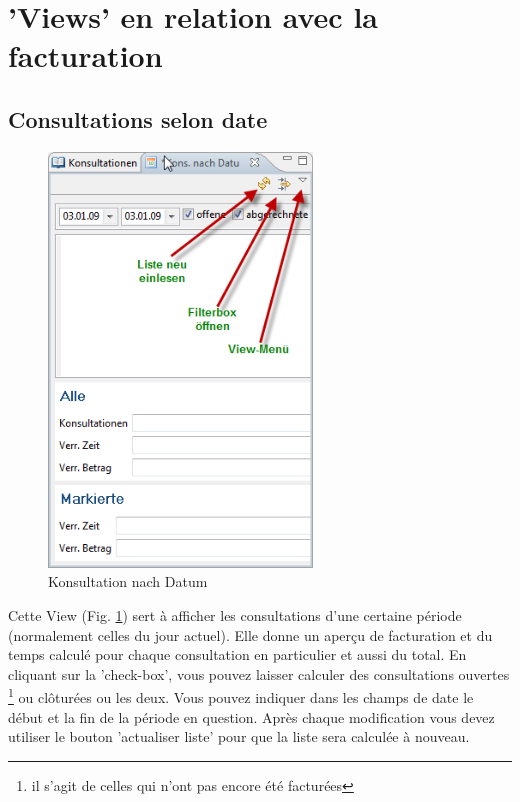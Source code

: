 %

\section{'Views' en relation avec la facturation}
\subsection{Consultations selon date}
\begin{figure}
\includegraphics[width=7cm]{images/heute}
\caption{Konsultation nach Datum}
\label{fig:heute}
\end{figure}

Cette View (Fig. \ref{fig:heute}) sert à afficher les consultations d'une certaine période (normalement celles du jour actuel). Elle donne un aperçu de facturation et du temps calculé pour chaque consultation en particulier et aussi du total. En cliquant sur la 'check-box', vous pouvez laisser calculer des consultations ouvertes \footnote{il s'agit de celles qui n'ont pas encore été facturées} ou clôturées ou les deux. Vous pouvez indiquer dans les champs de date le début et la fin de la période en question. Après chaque modification vous devez utiliser le bouton 'actualiser liste' pour que la liste sera calculée à nouveau.

